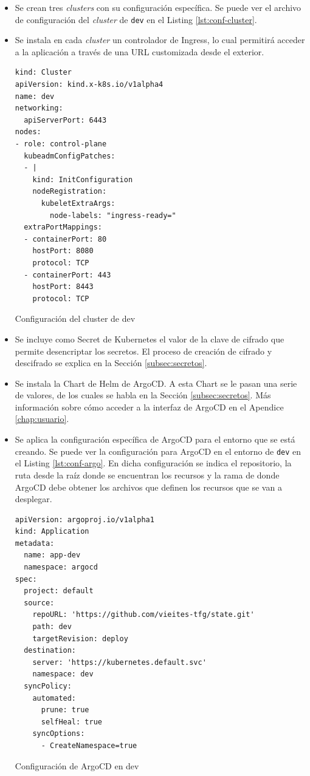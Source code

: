 \begin{itemize}
  \item Se crean tres \textit{clusters} con su configuración específica. Se puede ver el archivo de configuración del \textit{cluster} de \texttt{dev} en el Listing \ref{lst:conf-cluster}.
  \item Se instala en cada \textit{cluster} un controlador de Ingress, lo cual permitirá acceder a la aplicación a través de una URL customizada desde el exterior.

\begin{listing}[!ht]
  \begin{verbatim}
kind: Cluster
apiVersion: kind.x-k8s.io/v1alpha4
name: dev
networking:
  apiServerPort: 6443
nodes:
- role: control-plane
  kubeadmConfigPatches:
  - |
    kind: InitConfiguration
    nodeRegistration:
      kubeletExtraArgs:
        node-labels: "ingress-ready="
  extraPortMappings:
  - containerPort: 80
    hostPort: 8080
    protocol: TCP
  - containerPort: 443
    hostPort: 8443
    protocol: TCP
  \end{verbatim}
  \caption{Configuración del cluster de dev}
  \label{lst:conf-cluster}
\end{listing}

  \item Se incluye como Secret de Kubernetes el valor de la clave de cifrado que permite desencriptar los secretos. El proceso de creación de cifrado y descifrado se explica en la Sección \ref{subsec:secretos}.
  \item Se instala la Chart de Helm de ArgoCD. A esta Chart se le pasan una serie de valores, de los cuales se habla en la Sección \ref{subsec:secretos}. Más información sobre cómo acceder a la interfaz de ArgoCD en el Apendice \ref{chap:usuario}.
  \item Se aplica la configuración específica de ArgoCD para el entorno que se está creando. Se puede ver la configuración para ArgoCD en el entorno de \texttt{dev} en el Listing \ref{lst:conf-argo}. En dicha configuración se indica el repositorio, la ruta desde la raíz donde se encuentran los recursos y la rama de donde ArgoCD debe obtener los archivos que definen los recursos que se van a desplegar.

\begin{listing}[!ht]
  \begin{verbatim}
apiVersion: argoproj.io/v1alpha1
kind: Application
metadata:
  name: app-dev
  namespace: argocd
spec:
  project: default
  source:
    repoURL: 'https://github.com/vieites-tfg/state.git'
    path: dev
    targetRevision: deploy
  destination:
    server: 'https://kubernetes.default.svc'
    namespace: dev
  syncPolicy:
    automated:
      prune: true
      selfHeal: true
    syncOptions:
      - CreateNamespace=true
    \end{verbatim}
    \caption{Configuración de ArgoCD en dev}
    \label{lst:conf-argo}
\end{listing}


\end{itemize}
